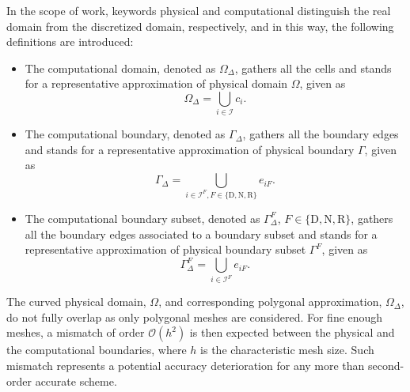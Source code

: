 In the scope of work, keywords physical and computational distinguish the real domain from the discretized domain, respectively, and in this way, the following definitions are introduced:
\begin{itemize}
\item The computational domain, denoted as $\Omega_{\Delta}$, gathers all the cells and stands for a representative approximation of physical domain $\Omega$, given as
\begin{equation}
\Omega_{\Delta}=\bigcup_{i\in\mathcal{I}}c_{i}.
\end{equation}

\item The computational boundary, denoted as $\Gamma_{\Delta}$, gathers all the boundary edges and stands for a representative approximation of physical boundary $\Gamma$, given as
\begin{equation}
\Gamma_{\Delta}=\bigcup_{i\in\mathcal{I}^{F},F\in\lbrace\textrm{D},\textrm{N},\textrm{R}\rbrace}e_{iF}.
\end{equation}

\item The computational boundary subset, denoted as $\Gamma^{F}_{\Delta}$, $F\in\lbrace\textrm{D},\textrm{N},\textrm{R}\rbrace$, gathers all the boundary edges associated to a boundary subset and stands for a representative approximation of physical boundary subset $\Gamma^{F}$, given as
\begin{equation}
\Gamma^{F}_{\Delta}=\bigcup_{i\in\mathcal{I}^{F}}e_{iF}.
\end{equation}

\end{itemize}

\begin{myremark}
The curved physical domain, $\Omega$, and corresponding polygonal approximation, $\Omega_{\Delta}$, do not fully overlap as only polygonal meshes are considered.
For fine enough meshes, a mismatch of order $\mathcal{O}\left(h^{2}\right)$ is then expected between the physical and the computational boundaries, where $h$ is the characteristic mesh size.
Such mismatch represents a potential accuracy deterioration for any more than second-order accurate scheme.
\end{myremark}

